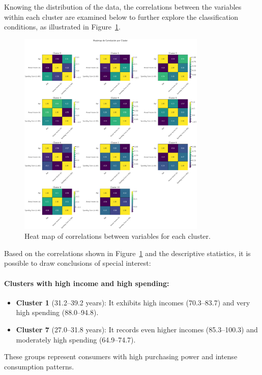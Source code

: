 \documentclass[10pt]{article}
\begin{document}
Knowing the distribution of the data, the correlations between the variables within each cluster are examined below to further explore the classification conditions, as illustrated in Figure~\ref{fig:miGrafico14}.

\begin{figure}[p]
    \centering
    \includegraphics[width=0.8\textwidth]{plots_investing/Grafico 14.png}
    \caption{Heat map of correlations between variables for each cluster.}
    \label{fig:miGrafico14}
\end{figure}

Based on the correlations shown in Figure~\ref{fig:miGrafico14} and the descriptive statistics, it is possible to draw conclusions of special interest:


\paragraph{Clusters with high income and high spending:}
\begin{itemize}
    \item \textbf{Cluster 1} (31.2--39.2 years): It exhibits high incomes (70.3--83.7) and very high spending (88.0--94.8).
    \item \textbf{Cluster 7} (27.0--31.8 years): It records even higher incomes (85.3--100.3) and moderately high spending (64.9--74.7).
\end{itemize}
These groups represent consumers with high purchasing power and intense consumption patterns.
\end{document}
